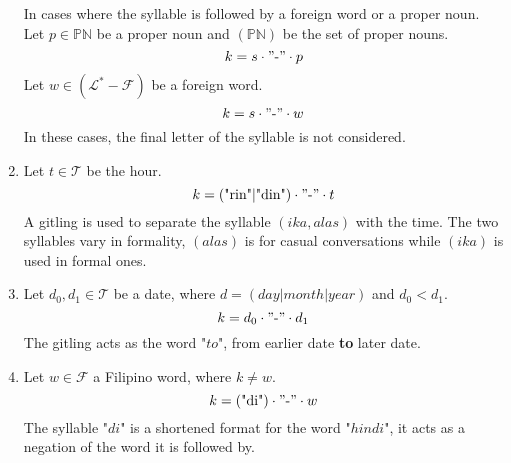 \begin{enumerate}
            In cases where the syllable is followed by a foreign word or a proper noun. Let \(p \in \mathbb{PN}\) be a proper noun and \((\mathbb{PN})\) be the set of proper nouns.
            \[
                  k = s \cdot "\text{-}" \cdot p
            \]
            Let \(w \in \mathcal{(L^*-F)}\) be a foreign word.
            \[
                  k = s \cdot "\text{-}" \cdot w
            \]
            In these cases, the final letter of the syllable is not considered.
      \item
            Let \(t \in \mathcal{T}\) be the hour.
            \[
                  k = (\text{"rin"}|\text{"din"}) \cdot "\text{-}" \cdot t
            \]
            A gitling is used to separate the syllable $(ika, alas)$ with the time. The two syllables vary in formality, $(alas)$ is for casual conversations while $(ika)$ is used in formal ones.
      \item
            Let \(d_0, d_1 \in \mathcal{T}\) be a date, where \(d = (day | month | year)\) and \(d_0 < d_1\).
            \[
                  k = d_0 \cdot "\text{-}" \cdot d_1
            \]
            The gitling acts as the word "$to$", from earlier date \textbf{to} later date.
      \item
            Let \(w \in \mathcal{F}\) a Filipino word, where \(k \ne w\).
            \[
                  k = (\text{"di"}) \cdot "\text{-}" \cdot w
            \]
            The syllable "$di$" is a shortened format for the word "$hindi$", it acts as a negation of the word it is followed by.


\end{enumerate}